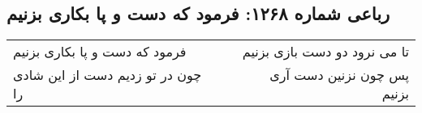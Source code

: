 \begin{center}
\section*{رباعی شماره ۱۲۶۸: فرمود که دست و پا بکاری بزنیم}
\label{sec:1268}
\begin{longtable}{l p{0.5cm} r}
فرمود که دست و پا بکاری بزنیم
&&
تا می نرود دو دست بازی بزنیم
\\
چون در تو زدیم دست از این شادی را
&&
پس چون نزنین دست آری بزنیم
\\
\end{longtable}
\end{center}
